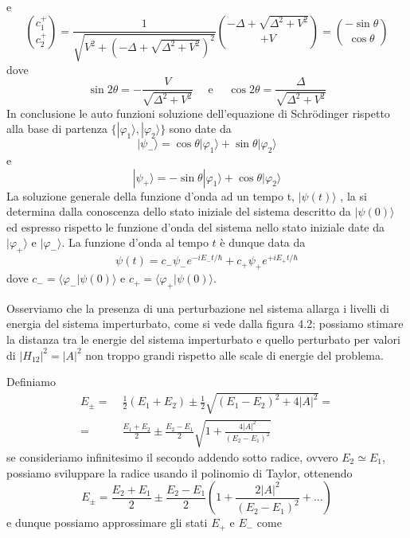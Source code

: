 e
\begin{equation*}
	\binom{c_1^{+}}{c_2^{+}}=\frac{1}{\sqrt{V^2+\left(-\Delta+\sqrt{\Delta^2+V^2}\right)^2}}\binom{-\Delta+\sqrt{\Delta^2+V^2}}{+V}=\binom{-\sin \theta}{\cos \theta}
\end{equation*}
dove 
\begin{equation*}
	\sin 2 \theta=-\frac{V}{\sqrt{\Delta^2+V^2}} \quad \text { e } \quad \cos 2 \theta=\frac{\Delta}{\sqrt{\Delta^2+V^2}}
\end{equation*}
In conclusione le auto funzioni soluzione dell'equazione di Schr\"odinger rispetto alla base di partenza $\{|\varphi_1 \rangle , |\varphi_2 \rangle \}$ sono date da 
\begin{equation*}
	|\psi_- \rangle = \cos\theta |\varphi_1 \rangle + \sin \theta |\varphi_2 \rangle 
\end{equation*}
e 
\begin{equation*}
	|\psi_{+} \rangle = - \sin \theta |\varphi_1 \rangle + \cos \theta |\varphi_2 \rangle 
\end{equation*}
La soluzione generale della funzione d'onda ad un tempo t, $|\psi(t) \rangle $ , la si determina dalla conoscenza dello stato iniziale del sistema descritto da $|\psi(0) \rangle $ ed espresso rispetto le funzione d'onda del sistema nello stato iniziale date da $|\varphi_+ \rangle $ e $|\varphi_- \rangle $. La funzione d'onda al tempo $t$ \`e dunque data da 
\begin{equation*}
	\psi(t)=c_{-} \psi_{-} e^{-i E_{-} t / \hbar}+c_{+} \psi_{+} e^{+i E_{+} t / \hbar}
\end{equation*}
dove $c_- = \langle \varphi_- | \psi(0) \rangle $ e $c_+ = \langle \varphi_+ |\psi(0) \rangle $.
\newline

\noindent Osserviamo che la presenza di una perturbazione nel sistema allarga i livelli di energia del sistema imperturbato, come si vede dalla figura 4.2; possiamo stimare la distanza tra le energie del sistema imperturbato e quello perturbato per valori di $|H_{12}|^2 = |A|^2$ non troppo grandi rispetto alle scale di energie del problema.

Definiamo 
\begin{align*}
E_{\pm}= & \; \frac{1}{2}\left(E_1+E_2\right)\pm \frac{1}{2} \sqrt{\left(E_1-E_2\right)^2+4\left|A\right|^2} = \\[0.5cm]
 = & \; \frac{E_1 + E_2}{2} \pm \frac{E_2 -E_1}{2} \sqrt{1 + \frac{4|A|^2}{(E_2-E_1)^2}}
\end{align*}
se consideriamo infinitesimo il secondo addendo sotto radice, ovvero $E_2 \simeq E_1$, possiamo sviluppare la radice usando il polinomio di Taylor, ottenendo
\begin{equation*}
	E_{\pm} = \frac{E_2 +E_1}{2} \pm \frac{E_2-E_1}{2} \left ( 1 + \frac{2|A|^2}{(E_2-E_1)^2}+ ...\right) 
\end{equation*}
e dunque possiamo approssimare gli stati $E_+$ e $E_-$ come 
\newpage

